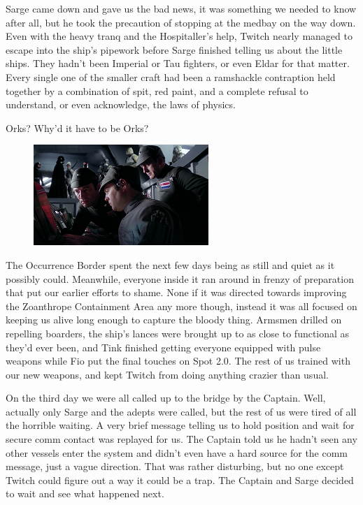 Sarge came down and gave us the bad news, it was something we needed to know after all, but he took the precaution of stopping at the medbay on the way down. 
Even with the heavy tranq and the Hospitaller's help, Twitch nearly managed to escape into the ship's pipework before Sarge finished telling us about the little ships. 
They hadn't been Imperial or Tau fighters, or even Eldar for that matter. 
Every single one of the smaller craft had been a ramshackle contraption held together by a combination of spit, red paint, and a complete refusal to understand, or even acknowledge, the laws of physics.

Orks? 
Why'd it have to be Orks?
\begin{figure}
	\begin{center}
		\includegraphics[width=\figwidth]{pics/12/14.png}
	\end{center}
\end{figure}
The Occurrence Border spent the next few days being as still and quiet as it possibly could. 
Meanwhile, everyone inside it ran around in frenzy of preparation that put our earlier efforts to shame. 
None if it was directed towards improving the Zoanthrope Containment Area any more though, instead it was all focused on keeping us alive long enough to capture the bloody thing. 
Armsmen drilled on repelling boarders, the ship's lances were brought up to as close to functional as they'd ever been, and Tink finished getting everyone equipped with pulse weapons while Fio put the final touches on Spot 2.0. 
The rest of us trained with our new weapons, and kept Twitch from doing anything crazier than usual.

On the third day we were all called up to the bridge by the Captain. 
Well, actually only Sarge and the adepts were called, but the rest of us were tired of all the horrible waiting. 
A very brief message telling us to hold position and wait for secure comm contact was replayed for us. 
The Captain told us he hadn't seen any other vessels enter the system and didn't even have a hard source for the comm message, just a vague direction. 
That was rather disturbing, but no one except Twitch could figure out a way it could be a trap. 
The Captain and Sarge decided to wait and see what happened next.

